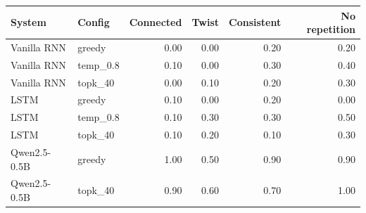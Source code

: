 \begin{tabular}{llrrrr}
\toprule
System & Config & Connected & Twist & Consistent & No repetition \\
\midrule
Vanilla RNN & greedy & 0.00 & 0.00 & 0.20 & 0.20 \\
Vanilla RNN & temp\_0.8 & 0.10 & 0.00 & 0.30 & 0.40 \\
Vanilla RNN & topk\_40 & 0.00 & 0.10 & 0.20 & 0.30 \\
LSTM & greedy & 0.10 & 0.00 & 0.20 & 0.00 \\
LSTM & temp\_0.8 & 0.10 & 0.30 & 0.30 & 0.50 \\
LSTM & topk\_40 & 0.10 & 0.20 & 0.10 & 0.30 \\
Qwen2.5-0.5B & greedy & 1.00 & 0.50 & 0.90 & 0.90 \\
Qwen2.5-0.5B & topk\_40 & 0.90 & 0.60 & 0.70 & 1.00 \\
\bottomrule
\end{tabular}
